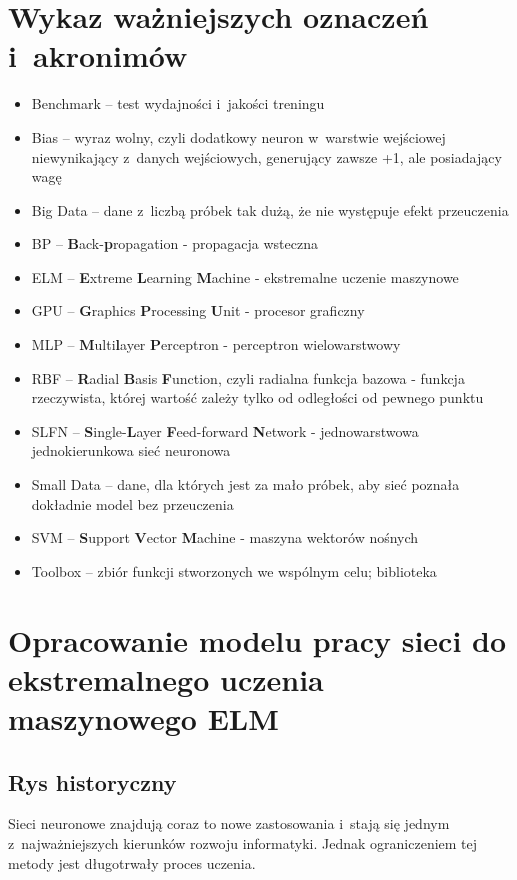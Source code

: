 \documentclass{article}
\begin{document}
\section*{Wykaz ważniejszych oznaczeń i~akronimów}
\begin{itemize}[label={},leftmargin=*]
\item Benchmark -- test wydajności i~jakości treningu
\item Bias -- wyraz wolny, czyli dodatkowy neuron w~warstwie wejściowej niewynikający z~danych wejściowych, generujący zawsze +1, ale posiadający wagę
\item Big Data -- dane z~liczbą próbek tak dużą, że nie występuje efekt przeuczenia
\item BP -- \textbf{B}ack-\textbf{p}ropagation - propagacja wsteczna
\item ELM -- \textbf{E}xtreme \textbf{L}earning \textbf{M}achine - ekstremalne uczenie maszynowe
\item GPU -- \textbf{G}raphics \textbf{P}rocessing \textbf{U}nit - procesor graficzny
\item MLP -- \textbf{M}ulti\textbf{l}ayer \textbf{P}erceptron - perceptron wielowarstwowy
\item RBF -- \textbf{R}adial \textbf{B}asis \textbf{F}unction, czyli radialna funkcja bazowa - funkcja rzeczywista, której wartość zależy tylko od odległości od pewnego punktu
\item SLFN -- \textbf{S}ingle-\textbf{L}ayer \textbf{F}eed-forward \textbf{N}etwork - jednowarstwowa jednokierunkowa sieć neuronowa
\item Small Data -- dane, dla których jest za mało próbek, aby sieć poznała dokładnie model bez przeuczenia
\item SVM -- \textbf{S}upport \textbf{V}ector \textbf{M}achine - maszyna wektorów nośnych
\item Toolbox -- zbiór funkcji stworzonych we wspólnym celu; biblioteka
\end{itemize}
\clearpage
\section{Opracowanie modelu pracy sieci do ekstremalnego uczenia maszynowego ELM}
\subsection{Rys historyczny}
Sieci neuronowe znajdują coraz to nowe zastosowania i~stają się jednym z~najważniejszych kierunków rozwoju informatyki. Jednak ograniczeniem tej metody jest długotrwały proces uczenia.
\end{document}
